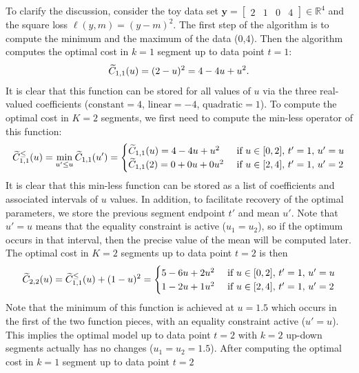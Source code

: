 \documentclass{article}
\newcommand{\RR}{\mathbb R}
\begin{document}
To clarify the discussion, consider the 
toy data set $\mathbf y= \left[
\begin{array}{cccccc}
  2 & 1 & 0 & 4
\end{array}
\right] \in\RR^4$ and the square loss $\ell(y,m)=(y-m)^2$. The first
step of the algorithm is to compute the minimum and the maximum of the
data (0,4). Then the algorithm computes the optimal cost in $k=1$
segment up to data point $t=1$:
\begin{equation}
  \widetilde{C}_{1,1}(u) = (2-u)^2=4 - 4u + u^2.
\end{equation}
It is clear that this function can be stored for all values of $u$ via
the three real-valued coefficients ($\text{constant}=4$,
$\text{linear}=-4$, $\text{quadratic}=1$). To compute the optimal cost
in $K=2$ segments, we first need to compute the min-less operator of
this function:
\begin{equation}
  \widetilde{C}_{1,1}^\leq(u) =\min_{u'\leq u}\widetilde{C}_{1,1}(u')=
  \begin{cases}
    \widetilde{C}_{1,1}(u) = 4 - 4u + u^2 &\text{ if }u\in[0,2],\, t'=1,\, u'=u\\
    \widetilde{C}_{1,1}(2) = 0 + 0u + 0u^2 & \text{ if }u\in[2,4],\, t'=1,\, u'=2
  \end{cases}
\end{equation}
It is clear that this min-less function can be stored as a list of
coefficients and associated intervals of $u$ values. In addition, to
facilitate recovery of the optimal parameters, we store the previous
segment endpoint $t'$ and mean $u'$. Note that $u'=u$ means that the
equality constraint is active ($u_1=u_2$), so if the optimum occurs in that
interval, then the precise value of the mean will be computed
later. The optimal cost in $K=2$ segments up to data point $t=2$ is
then
\begin{equation}
  \widetilde{C}_{2,2}(u) = \widetilde{C}_{1,1}^\leq(u)+(1-u)^2 = 
  \begin{cases}
    5 - 6u + 2u^2 &\text{ if }u\in[0,2],\, t'=1,\, u'=u\\
    1 - 2u + 1u^2 &\text{ if }u\in[2,4],\, t'=1,\, u'=2
  \end{cases}
\end{equation}
Note that the minimum of this function is achieved at $u=1.5$ which
occurs in the first of the two function pieces, with an equality
constraint active ($u'=u$). This implies the optimal model up to data
point $t=2$ with $k=2$ up-down segments actually has no changes
($u_1=u_2=1.5$). After computing the optimal cost in $k=1$ segment up
to data point $t=2$
\end{document}
